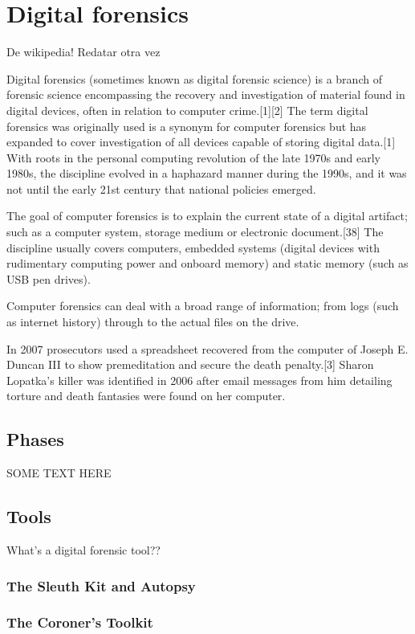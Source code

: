 \chapter{Digital forensics}

De wikipedia! Redatar otra vez

Digital forensics (sometimes known as digital forensic science) is a branch of
forensic science encompassing the recovery and investigation of material found
in digital devices, often in relation to computer crime.[1][2] The term digital
forensics was originally used is a synonym for computer forensics but has
expanded to cover investigation of all devices capable of storing digital
data.[1] With roots in the personal computing revolution of the late 1970s and
early 1980s, the discipline evolved in a haphazard manner during the 1990s, and
it was not until the early 21st century that national policies emerged.

The goal of computer forensics is to explain the current state of a digital
artifact; such as a computer system, storage medium or electronic document.[38]
The discipline usually covers computers, embedded systems (digital devices with
rudimentary computing power and onboard memory) and static memory (such as USB
pen drives).

Computer forensics can deal with a broad range of information; from logs (such
as internet history) through to the actual files on the drive.

In 2007 prosecutors used a spreadsheet recovered from the computer of Joseph E.
Duncan III to show premeditation and secure the death penalty.[3] Sharon
Lopatka's killer was identified in 2006 after email messages from him detailing
torture and death fantasies were found on her computer.

\section{Phases}

SOME TEXT HERE



\section{Tools}

What's a digital forensic tool??

\subsection{The Sleuth Kit and Autopsy}

\subsection{The Coroner's Toolkit}

